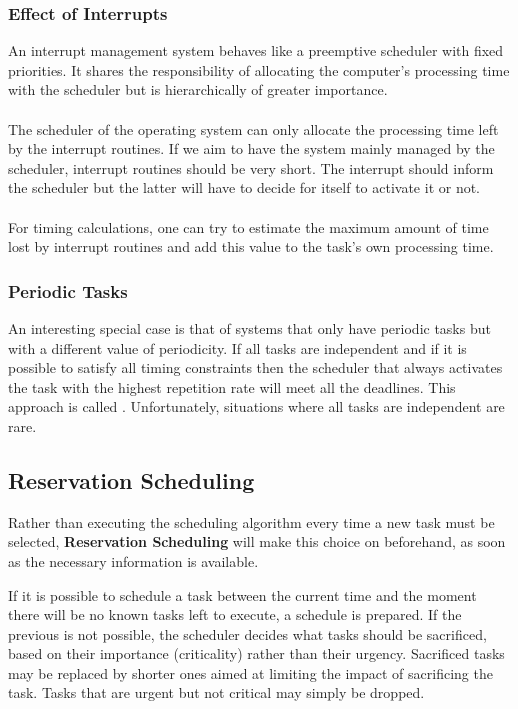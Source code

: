 \subsubsection{Effect of Interrupts}
An interrupt management system behaves like a preemptive scheduler with fixed priorities. It shares the responsibility of allocating the computer's processing time with the scheduler but is hierarchically of greater importance.
\\\\
The scheduler of the operating system can only allocate the processing time left by the interrupt routines. If we aim to have the system mainly managed by the scheduler, interrupt routines should be very short. The interrupt should inform the scheduler but the latter will have to decide for itself to activate it or not.
\\\\
For timing calculations, one can try to estimate the maximum amount of time lost by interrupt routines and add this value to the task's own processing time.

\subsubsection{Periodic Tasks}
An interesting special case is that of systems that only  have periodic tasks but with a different value of periodicity.
If all tasks are independent and if it is possible to satisfy all timing constraints then the scheduler that always activates the task with the highest repetition rate will meet all the deadlines.
This approach is called . Unfortunately, situations where all tasks are independent are rare.

\subsection{Reservation Scheduling}
Rather than executing the scheduling algorithm every time a new task must be selected, \textbf{Reservation Scheduling} will make this choice on beforehand, as soon as the necessary information is available. 

If it is possible to schedule a task between the current time and the moment there will be no known tasks left to execute, a schedule is prepared. If the previous is not possible, the scheduler decides what tasks should be sacrificed, based on their importance (criticality) rather than their urgency. Sacrificed tasks may be replaced by shorter ones aimed at limiting the impact of sacrificing the task. Tasks that are urgent but not critical may simply be dropped.


